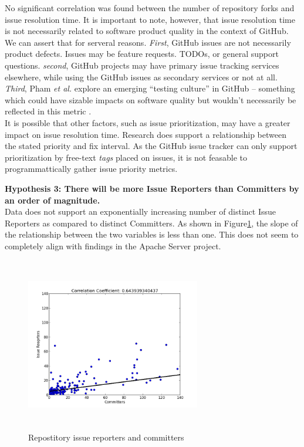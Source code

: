 \documentclass{proc}
\begin{document}
No significant correlation was found between the number of repository forks and issue resolution time. It is important to note, however, that issue resolution time is not necessarily related to software product quality in the context of GitHub. We can assert that for serveral reasons. \textit{First}, GitHub issues are not necessarily product defects. Issues may be feature requests. TODOs, or general support questions. \textit{second}, GitHub projects may have primary issue tracking services elsewhere, while using the GitHub issues as secondary services or not at all. \textit{Third}, Pham \textit{et al.} explore an emerging ``testing culture'' in GitHub -- something which could have sizable impacts on software quality but wouldn't necessarily be reflected in this metric \cite{phamcreating}.\\

It is possible that other factors, such as issue prioritization, may have a greater impact on issue resolution time. Research does support a relationship\cite{mockus2002two} between the stated priority and fix interval. As the GitHub issue tracker can only support prioritization by free-text \textit{tags} placed on issues, it is not feasable to programmattically gather issue priority metrics.

\textbf{Hypothesis 3: There will be more Issue Reporters than Committers by an order of magnitude.}\\
Data does not support an exponentially increasing number of distinct Issue Reporters as compared to distinct Committers. 
As shown in Figure\ref{fig:issue_reporters_committers_scatterplot}, the slope of the relationship between the two variables is less than one. This does not seem to completely align with findings in the Apache Server project\cite{mockus2000case}. 

\begin{figure}
\includegraphics[height=3in,width=3in]{images/issue_reporters_committers_scatterplot.png}
\caption{Repostitory issue reporters and committers}
\label{fig:issue_reporters_committers_scatterplot}
\end{figure}
\end{document}
